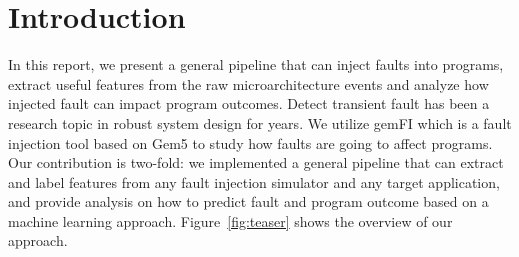 \section{Introduction}
In this report, we present a general pipeline that can inject faults into programs, extract useful features from the raw microarchitecture events and analyze how injected fault can impact program outcomes. Detect transient fault has been a research topic in robust system design for years. We utilize gemFI \cite{parasyris2014gemfi} which is a fault injection tool based on Gem5\cite{Binkert:2011:GS:2024716.2024718} to study how faults are going to affect programs. Our contribution is two-fold: we implemented a general pipeline that can extract and label features from any fault injection simulator and any target application, and provide analysis on how to predict fault and program outcome based on a machine learning approach. Figure~\ref{fig:teaser} shows the overview of our approach.
